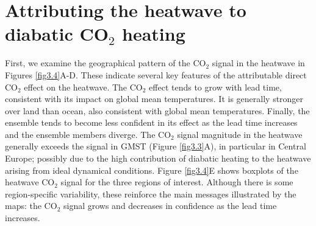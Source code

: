 \section{Attributing the heatwave to diabatic CO$_2$ heating}\label{ch3:attribution}

  First, we examine the geographical pattern of the CO$_2$ signal in the heatwave in Figures \ref{fig3.4}A-D. These indicate several key features of the attributable direct CO$_2$ effect on the heatwave. The CO$_2$ effect tends to grow with lead time, consistent with its impact on global mean temperatures. It is generally stronger over land than ocean, also consistent with global mean temperatures. Finally, the ensemble tends to become less confident in its effect as the lead time increases and the ensemble members diverge. The CO$_2$ signal magnitude in the heatwave generally exceeds the signal in GMST (Figure \ref{fig3.3}A), in particular in Central Europe; possibly due to the high contribution of diabatic heating to the heatwave arising from ideal dynamical conditions. Figure \ref{fig3.4}E shows boxplots of the heatwave CO$_2$ signal for the three regions of interest. Although there is some region-specific variability, these reinforce the main messages illustrated by the maps: the CO$_2$ signal grows and decreases in confidence as the lead time increases.

